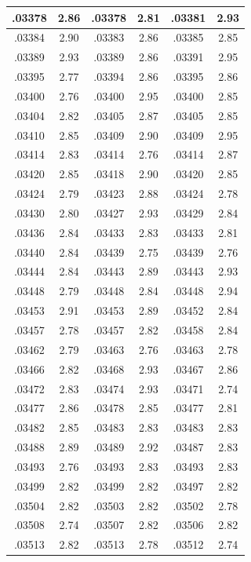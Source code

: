 \documentclass[10pt,twoside]{report}
\begin{document}
\begin{appendices}
\begin{longtable}{|c|c||c|c||c|c|}
.03378 & 2.86 & .03378 & 2.81 & .03381 & 2.93\\\hline
.03384 & 2.90 & .03383 & 2.86 & .03385 & 2.85\\\hline
.03389 & 2.93 & .03389 & 2.86 & .03391 & 2.95\\\hline
.03395 & 2.77 & .03394 & 2.86 & .03395 & 2.86\\\hline
.03400 & 2.76 & .03400 & 2.95 & .03400 & 2.85\\\hline
.03404 & 2.82 & .03405 & 2.87 & .03405 & 2.85\\\hline
.03410 & 2.85 & .03409 & 2.90 & .03409 & 2.95\\\hline
.03414 & 2.83 & .03414 & 2.76 & .03414 & 2.87\\\hline
.03420 & 2.85 & .03418 & 2.90 & .03420 & 2.85\\\hline
.03424 & 2.79 & .03423 & 2.88 & .03424 & 2.78\\\hline
.03430 & 2.80 & .03427 & 2.93 & .03429 & 2.84\\\hline
.03436 & 2.84 & .03433 & 2.83 & .03433 & 2.81\\\hline
.03440 & 2.84 & .03439 & 2.75 & .03439 & 2.76\\\hline
.03444 & 2.84 & .03443 & 2.89 & .03443 & 2.93\\\hline
.03448 & 2.79 & .03448 & 2.84 & .03448 & 2.94\\\hline
.03453 & 2.91 & .03453 & 2.89 & .03452 & 2.84\\\hline
.03457 & 2.78 & .03457 & 2.82 & .03458 & 2.84\\\hline
.03462 & 2.79 & .03463 & 2.76 & .03463 & 2.78\\\hline
.03466 & 2.82 & .03468 & 2.93 & .03467 & 2.86\\\hline
.03472 & 2.83 & .03474 & 2.93 & .03471 & 2.74\\\hline
.03477 & 2.86 & .03478 & 2.85 & .03477 & 2.81\\\hline
.03482 & 2.85 & .03483 & 2.83 & .03483 & 2.83\\\hline
.03488 & 2.89 & .03489 & 2.92 & .03487 & 2.83\\\hline
.03493 & 2.76 & .03493 & 2.83 & .03493 & 2.83\\\hline
.03499 & 2.82 & .03499 & 2.82 & .03497 & 2.82\\\hline
.03504 & 2.82 & .03503 & 2.82 & .03502 & 2.78\\\hline
.03508 & 2.74 & .03507 & 2.82 & .03506 & 2.82\\\hline
.03513 & 2.82 & .03513 & 2.78 & .03512 & 2.74\\\hline

\end{longtable}
\end{appendices}
\end{document}
